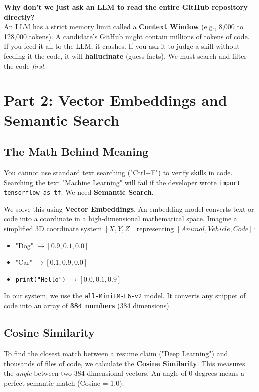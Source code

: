 \documentclass[12pt,a4paper]{article}
\begin{document}
\begin{tcolorbox}[colback=red!5!white,colframe=red!75!black,title=The Context Window Problem]
\textbf{Why don't we just ask an LLM to read the entire GitHub repository directly?} \\
An LLM has a strict memory limit called a \textbf{Context Window} (e.g., 8,000 to 128,000 tokens). A candidate's GitHub might contain millions of tokens of code. If you feed it all to the LLM, it crashes. If you ask it to judge a skill without feeding it the code, it will \textbf{hallucinate} (guess facts). We must search and filter the code \textit{first}.
\end{tcolorbox}

\section{Part 2: Vector Embeddings and Semantic Search}

\subsection{The Math Behind Meaning}
You cannot use standard text searching ("Ctrl+F") to verify skills in code. Searching the text "Machine Learning" will fail if the developer wrote \texttt{import tensorflow as tf}. We need \textbf{Semantic Search}.

We solve this using \textbf{Vector Embeddings}. An embedding model converts text or code into a coordinate in a high-dimensional mathematical space.
Imagine a simplified 3D coordinate system $[X, Y, Z]$ representing $[Animal, Vehicle, Code]$:
\begin{itemize}
    \item "Dog" $\rightarrow [0.9, 0.1, 0.0]$
    \item "Car" $\rightarrow [0.1, 0.9, 0.0]$
    \item \texttt{print("Hello")} $\rightarrow [0.0, 0.1, 0.9]$
\end{itemize}

In our system, we use the \texttt{all-MiniLM-L6-v2} model. It converts any snippet of code into an array of \textbf{384 numbers} (384 dimensions).

\subsection{Cosine Similarity}
To find the closest match between a resume claim ("Deep Learning") and thousands of files of code, we calculate the \textbf{Cosine Similarity}. This measures the \textit{angle} between two 384-dimensional vectors. An angle of 0 degrees means a perfect semantic match (Cosine = 1.0).
\end{document}
